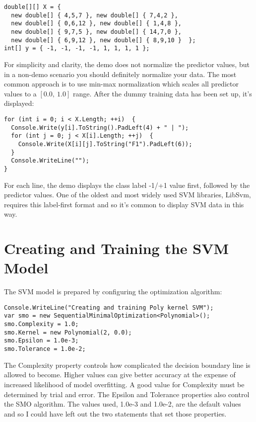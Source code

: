 \documentclass[13pt]{article}
\begin{document}
\begin{verbatim}
double[][] X = {
  new double[] { 4,5,7 }, new double[] { 7,4,2 },
  new double[] { 0,6,12 }, new double[] { 1,4,8 },
  new double[] { 9,7,5 }, new double[] { 14,7,0 },
  new double[] { 6,9,12 }, new double[] { 8,9,10 }  };
int[] y = { -1, -1, -1, -1, 1, 1, 1, 1 };
\end{verbatim}

\noindent
For simplicity and clarity, the demo does not normalize the predictor values, but in a non-demo scenario you should definitely normalize your data. The most common approach is to use min-max normalization which scales all predictor values to a $[0.0,\ 1.0]$ range. After the dummy training data has been set up, it's displayed:

\begin{verbatim}
for (int i = 0; i < X.Length; ++i)  {
  Console.Write(y[i].ToString().PadLeft(4) + " | ");
  for (int j = 0; j < X[i].Length; ++j)  {
    Console.Write(X[i][j].ToString("F1").PadLeft(6));
  }
  Console.WriteLine("");
}  
\end{verbatim}

\noindent
For each line, the demo displays the class label -1/+1 value first, followed by the predictor values. One of the oldest and most widely used SVM libraries, LibSvm, requires this label-first format and so it's common to display SVM data in this way.\\

\section{Creating and Training the SVM Model}

The SVM model is prepared by configuring the optimization algorithm:

\begin{verbatim}
Console.WriteLine("Creating and training Poly kernel SVM");
var smo = new SequentialMinimalOptimization<Polynomial>();
smo.Complexity = 1.0;
smo.Kernel = new Polynomial(2, 0.0);
smo.Epsilon = 1.0e-3;
smo.Tolerance = 1.0e-2;
\end{verbatim}

\noindent
The Complexity property controls how complicated the decision boundary line is allowed to become. Higher values can give better accuracy at the expense of increased likelihood of model overfitting. A good value for Complexity must be determined by trial and error. The Epsilon and Tolerance properties also control the SMO algorithm. The values used, 1.0e-3 and 1.0e-2, are the default values and so I could have left out the two statements that set those properties.\\
\end{document}
